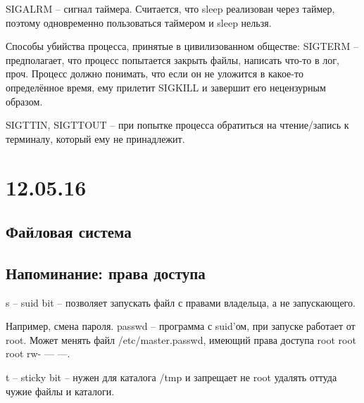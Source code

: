 \documentclass[a4paper,10pt]{article}
\begin{document}
SIGALRM -- сигнал таймера. Считается, что sleep реализован через таймер, поэтому одновременно пользоваться таймером и sleep нельзя.

Способы убийства процесса, принятые в цивилизованном обществе:
SIGTERM -- предполагает, что процесс попытается закрыть файлы, написать что-то в лог, проч. Процесс должно понимать, что если он не уложится в какое-то определённое время, ему прилетит SIGKILL и завершит его нецензурным образом.

SIGTTIN, SIGTTOUT -- при попытке процесса обратиться на чтение/запись к терминалу, который ему не принадлежит.

\section{12.05.16}
\subsection{Файловая система}

\subsection{Напоминание: права доступа}

s -- suid bit -- позволяет запускать файл с правами владельца, а не запускающего.

Например, смена пароля. passwd -- программа с suid'ом, при запуске работает от root. Может менять файл /etc/master.passwd, имеющий права доступа root root root rw- --- ---.

t -- sticky bit -- нужен для каталога /tmp и запрещает не root удалять оттуда чужие файлы и каталоги.
\end{document}
